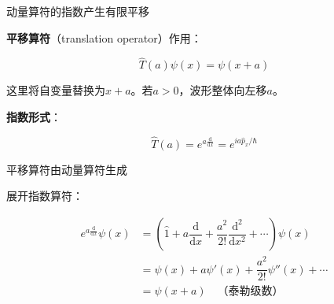 \begin{frame}{动量算符的指数产生有限平移}
    \begin{iqbitemize}
    \item \textbf{平移算符}（translation operator）作用：
    \end{iqbitemize}
      \[
        \hat{T}(a)\psi(x) = \psi(x+a)
      \]
    \begin{iqbitemize}
    \item 这里将自变量替换为$x+a$。若$a>0$，波形整体向左移$a$。
    \item \textbf{指数形式}：
    \end{iqbitemize}
      \[
        \hat{T}(a) = e^{a\frac{\mathrm{d}}{\mathrm{d}x}} = e^{ia\hat{p}_x/\hbar}
      \]
    \begin{iqbitemize}
    \item 平移算符由动量算符生成
    \end{iqbitemize}
    \iqbsmallsep

    \begin{iqbitemize}
    \item 展开指数算符：
    \end{iqbitemize}
      \[
        \begin{aligned}
          e^{a\frac{\mathrm{d}}{\mathrm{d}x}}\psi(x) &= \left(\hat{1} + a\dfrac{\mathrm{d}}{\mathrm{d}x} + \dfrac{a^2}{2!}\dfrac{\mathrm{d}^2}{\mathrm{d}x^2} + \cdots\right)\psi(x) \\
          &= \psi(x) + a\psi'(x) + \dfrac{a^2}{2!}\psi''(x) + \cdots \\
          &= \psi(x+a) \quad \text{（泰勒级数）}
        \end{aligned}
      \]
  
\end{frame}

